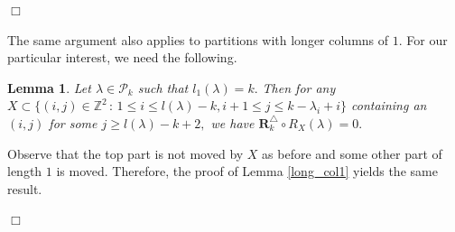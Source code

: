 \documentclass[11pt]{amsart}
\newtheorem{lemma}[theorem]{Lemma}
\newcommand{\bbox}{\hfill $\Box$}
\newcommand{\pf}{\noindent {\it Proof:} }
\begin{document}
\bbox

The same argument also applies to partitions with longer columns of $1.$ For our particular interest, we need the following.
\begin{lemma} \label{long_col2}
Let $\lambda \in \mathcal{P}_k$ such that $l_1(\lambda)=k.$ Then for any $X \subset \{(i,j) \in \mathbb{Z}^2 \, : \, 1 \leq i \leq l(\lambda)-k,i+1 \leq j \leq k-\lambda_i+i\}$ containing an $(i,j)$ for some $j\geq l(\lambda)-k+2,$ we have $\mathbf{R}_{k}^{\triangle} \circ R_X(\lambda)=0.$ 
\end{lemma}
\pf Observe that the top part is not moved by $X$ as before and some other part of length $1$ is moved. Therefore, the proof of Lemma \ref{long_col1} yields the same result.

\bbox



\end{document}
